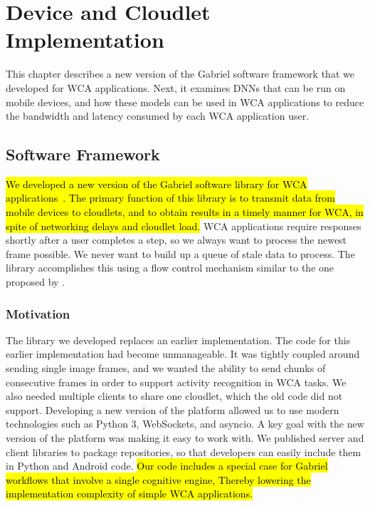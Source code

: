 \chapter{Device and Cloudlet Implementation}\label{chap:implementation}

This chapter describes a new version of the Gabriel software framework that we
developed for WCA applications.
Next, it examines DNNs that can be run on mobile devices, and how
these models can be used in WCA applications to reduce the bandwidth and
latency consumed by each WCA application user.

\section{Software Framework}

\hl{
  We developed a new version of the Gabriel software library for WCA
  applications~{\cite{gabriel_github}}.
  The primary function of this library is to transmit data from mobile
  devices to cloudlets, and to obtain results in a timely manner for WCA, in
  spite of networking delays and cloudlet load.
}
WCA applications require responses shortly after a user completes a step, so
we always want to process the newest frame possible. We never want to build up
a queue of stale data to process. The library accomplishes this using a flow
control mechanism similar to the one proposed by \citet{ha2014}.

\subsection{Motivation}

The library we developed replaces an earlier implementation.
The code for this earlier implementation had become unmanageable.
It was tightly coupled around sending single image frames, and we
wanted the ability to send chunks of consecutive frames in order to support
activity recognition in WCA tasks.
We also needed multiple clients to share one cloudlet, which the old code did
not support.
Developing a new version of the platform allowed us to use modern technologies
such as Python 3, WebSockets, and asyncio.
A key goal with the new version of the platform was making it easy to work with.
We published server and client libraries to package repositories, so that
developers can easily include them in Python and Android code.
\hl{
Our code includes a special case for Gabriel workflows that involve a single
cognitive engine, Thereby lowering the implementation complexity of simple WCA
applications.
}

